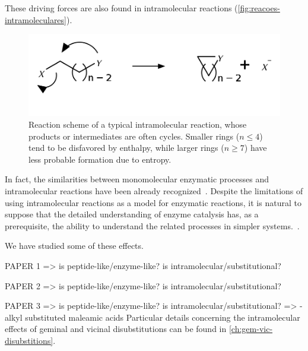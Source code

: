 These driving forces are also found in intramolecular reactions (\autoref{fig:reacoes-intramoleculares}).
%
\begin{figure}[hbtp]
    \centering
    \includegraphics[width=.6\textwidth]{figures/reacao-intramolecular}
    \caption[Typical scheme of an intramolecular reactions]{
        Reaction scheme of a typical intramolecular reaction, whose products or
        intermediates are often cycles.
        Smaller rings ($n \le 4 $)
        tend to be disfavored by enthalpy, while larger rings ($n \ge 7 $)
        have less probable formation due to entropy.}%
    \label{fig:reacoes-intramoleculares}
\end{figure}
%
In fact, the similarities between monomolecular enzymatic processes and
intramolecular reactions have been already recognized~\cite{Nilsson_1933,Bruice_1960b,Jung_1990}.
Despite the limitations of using intramolecular reactions as a model for
enzymatic reactions, it is natural to suppose that the detailed understanding
of enzyme catalysis has, as a prerequisite, the ability to understand the
related processes in simpler systems.~\cite{Kirby_1972}.

We have studied some of these effects.

PAPER 1 => is peptide-like/enzyme-like? is intramolecular/substitutional?

PAPER 2 => is peptide-like/enzyme-like? is intramolecular/substitutional?

PAPER 3 => is peptide-like/enzyme-like? is intramolecular/substitutional?
=> \emph{}-alkyl substituted maleamic acids
Particular details concerning the intramolecular effects of geminal and
vicinal disubstitutions can be found in \autoref{ch:gem-vic-disubstitions}.
